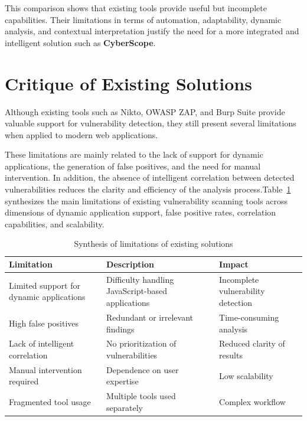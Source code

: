 \indent This comparison shows that existing tools provide useful but incomplete capabilities. Their limitations in terms of automation, adaptability, dynamic analysis, and contextual interpretation justify the need for a more integrated and intelligent solution such as \textbf{CyberScope}.

\section{Critique of Existing Solutions}

\indent Although existing tools such as Nikto, OWASP ZAP, and Burp Suite provide valuable support for vulnerability detection, they still present several limitations when applied to modern web applications.

\indent These limitations are mainly related to the lack of support for dynamic applications, the generation of false positives, and the need for manual intervention. In addition, the absence of intelligent correlation between detected vulnerabilities reduces the clarity and efficiency of the analysis process.Table~\ref{tab:limitations-synthesis} synthesizes the main limitations of existing vulnerability scanning tools across dimensions of dynamic application support, false positive rates, correlation capabilities, and scalability.




\begin{table}[H]
    \centering
    \caption{Synthesis of limitations of existing solutions}
    \label{tab:limitations-synthesis}
    \renewcommand{\arraystretch}{1.3}
    \begin{tabularx}{\textwidth}{|p{4cm}|X|X|}
        \hline
        \textbf{Limitation} & \textbf{Description} & \textbf{Impact} \\
        \hline
        Limited support for dynamic applications & Difficulty handling JavaScript-based applications & Incomplete vulnerability detection \\
        \hline
        High false positives & Redundant or irrelevant findings & Time-consuming analysis \\
        \hline
        Lack of intelligent correlation & No prioritization of vulnerabilities & Reduced clarity of results \\
        \hline
        Manual intervention required & Dependence on user expertise & Low scalability \\
        \hline
        Fragmented tool usage & Multiple tools used separately & Complex workflow \\
        \hline
    \end{tabularx}
\end{table}

